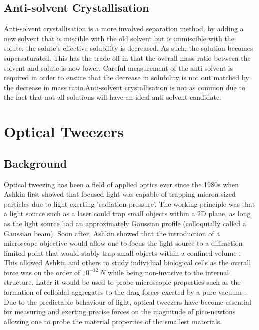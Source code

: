 \subsection{Anti-solvent Crystallisation} 
Anti-solvent crystallisation is a more involved separation method,
by adding a new solvent that is miscible with the old solvent but 
is immiscible with the solute, the solute's effective solubility 
is decreased. As such, the solution becomes supersaturated. This 
has the trade off in that the overall mass ratio between the solvent 
and solute is now lower. Careful measurement of the anti-solvent is 
required in order to ensure that the decrease in solubility is not 
out matched by the decrease in mass ratio.Anti-solvent crystallisation 
is not as common due to the fact that not all solutions will have an 
ideal anti-solvent candidate.

\section{Optical Tweezers}
\subsection{Background}
Optical tweezing has been a field of applied optics ever since 
the 1980s when Ashkin \cite{Ashkin1970} first showed that focused 
light was capable of trapping micron sized particles due to light 
exerting 'radiation pressure'. The working principle was that a 
light source such as a laser could trap small objects within a 2D 
plane, as long as the light source had an approximately Gaussian 
profile (colloquially called a Gaussian beam). Soon after, Ashkin 
showed that the introduction of a microscope objective would allow 
one to focus the light source to a diffraction limited point that 
would stably trap small objects within a confined volume 
\cite{Ashkin1980}. This allowed Ashkin and others to study individual 
biological cells as the overall force was on the order of $10^{-12}\ 
N$ while being non-invasive to the internal structure. Later it would 
be used to probe microscopic properties such as the formation of 
colloidal aggregates \cite{Yi2021} to the drag forces exerted by a 
pure vacuum \cite{Ahn2018, Monteiro2018}. Due to the predictable 
behaviour of light, optical tweezers have become essential for 
measuring and exerting precise forces on the magnitude of pico-newtons 
allowing one to probe the material properties of the smallest materials. 

